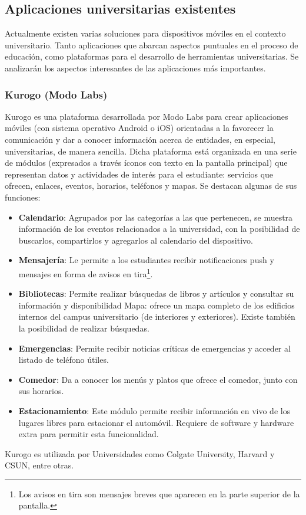 \subsection{Aplicaciones universitarias existentes}
\label{aplicaciones_existentes}

Actualmente existen varias soluciones para dispositivos móviles en el contexto universitario. Tanto aplicaciones que abarcan aspectos puntuales en el proceso de educación, como plataformas para el desarrollo de herramientas universitarias. Se analizarán los aspectos interesantes de las aplicaciones más importantes.

\subsubsection{Kurogo (Modo Labs)}
\label{aplicaciones_existentes_kurogo}


Kurogo es una plataforma desarrollada por Modo Labs para crear aplicaciones
móviles (con sistema operativo Android o iOS) orientadas a la favorecer la
comunicación y dar a conocer información acerca de entidades, en especial,
universitarias, de manera sencilla. Dicha plataforma está organizada en una
serie de módulos (expresados a través íconos con texto en la pantalla principal)
que representan datos y actividades de interés para el estudiante: servicios que
ofrecen, enlaces, eventos, horarios, teléfonos y mapas. Se destacan algunas de
sus funciones:
\begin{itemize}
  \item \textbf{Calendario}: Agrupados por las categorías a las que pertenecen,
  se muestra información de los eventos relacionados a la universidad, con la
  posibilidad de buscarlos, compartirlos y agregarlos al calendario del dispositivo.
  \item \textbf{Mensajería}: Le permite a los estudiantes recibir notificaciones
  push y mensajes en forma de avisos en tira\footnote{Los avisos en tira son
  mensajes breves que aparecen en la parte superior de la pantalla.}.
  \item \textbf{Bibliotecas}: Permite realizar búsquedas de libros y artículos y
  consultar su información y disponibilidad Mapa: ofrece un mapa completo de los
  edificios internos del campus universitario (de interiores y exteriores).
  Existe también la posibilidad de realizar búsquedas.
  \item \textbf{Emergencias}: Permite recibir noticias críticas de emergencias y
  acceder al listado de teléfono útiles.
  \item \textbf{Comedor}: Da a conocer los menús y platos que ofrece el comedor,
  junto con sus horarios.
  \item \textbf{Estacionamiento}: Este módulo permite recibir información en
  vivo de los lugares libres para estacionar el automóvil. Requiere de software
  y hardware extra para permitir esta funcionalidad.
\end{itemize}
Kurogo es utilizada por Universidades como Colgate University, Harvard y CSUN, entre otras.
